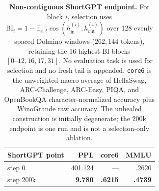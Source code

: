 \begin{table}[t]
\centering
\small
\setlength{\tabcolsep}{4pt}
\begin{tabular}{@{}lrrr@{}}
\toprule
\textbf{ShortGPT point} & \textbf{PPL} & \textbf{core6} & \textbf{MMLU} \\
\midrule
step 0 & 401.124 & --- & .2620 \\
step 200k & \textbf{9.780} & \textbf{.6215} & \textbf{.4739} \\
\bottomrule
\end{tabular}
\caption{\textbf{Non-contiguous ShortGPT endpoint.} For block $i$, selection
uses $\mathrm{BI}_i=1-\mathbb{E}_{x,t}\cos(h^{(i)}_{\mathrm{in}},
h^{(i)}_{\mathrm{out}})$ over 128 evenly spaced Dolmino windows
($262{,}144$ tokens), retaining the 16 highest-BI blocks
$[0\text{--}12,16,17,31]$. No evaluation task is used for selection and no
fresh tail is appended. \texttt{core6} is the unweighted macro-average of
HellaSwag, ARC-Challenge, ARC-Easy, PIQA, and OpenBookQA
character-normalized accuracy plus WinoGrande raw accuracy. The unhealed
construction is initially degenerate; the 200k endpoint is one run and is not
a selection-only ablation.}
\label{tab:app-shortgpt}
\end{table}
